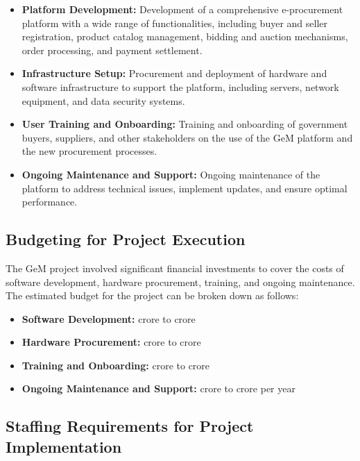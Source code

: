 \begin{itemize}
    \item \textbf{Platform Development:} Development of a comprehensive e-procurement platform with a wide range of functionalities, including buyer and seller registration, product catalog management, bidding and auction mechanisms, order processing, and payment settlement.
    
    \item \textbf{Infrastructure Setup:} Procurement and deployment of hardware and software infrastructure to support the platform, including servers, network equipment, and data security systems.
    
    \item \textbf{User Training and Onboarding:} Training and onboarding of government buyers, suppliers, and other stakeholders on the use of the GeM platform and the new procurement processes.
    
    \item \textbf{Ongoing Maintenance and Support:} Ongoing maintenance of the platform to address technical issues, implement updates, and ensure optimal performance.
\end{itemize}

\subsection{Budgeting for Project Execution}

The GeM project involved significant financial investments to cover the costs of software development, hardware procurement, training, and ongoing maintenance. The estimated budget for the project can be broken down as follows:

\begin{itemize}
    \item \textbf{Software Development:}  crore to  crore
    
    \item \textbf{Hardware Procurement:}  crore to  crore
    
    \item \textbf{Training and Onboarding:}  crore to  crore
    
    \item \textbf{Ongoing Maintenance and Support:}  crore to  crore per year
\end{itemize}

\subsection{Staffing Requirements for Project Implementation}

